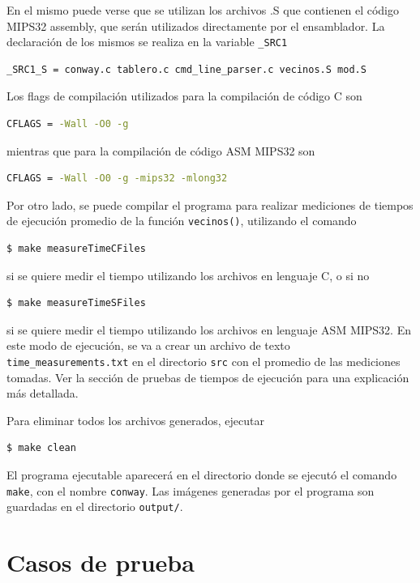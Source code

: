 \documentclass[a4paper,12pt]{article}
\numberwithin{equation}{section}
\numberwithin{figure}{section}
\begin{document}
En el mismo puede verse que se utilizan los archivos .S que contienen el código MIPS32 assembly, que serán utilizados directamente por el ensamblador. La declaración de los mismos se realiza en la variable \texttt{\_SRC1}
\begin{lstlisting}[language=bash, style=StyleC]
_SRC1_S = conway.c tablero.c cmd_line_parser.c vecinos.S mod.S
\end{lstlisting}

Los flags de compilación utilizados para la compilación de código C son
\begin{lstlisting}[language=bash, style=StyleC]
CFLAGS = -Wall -O0 -g
\end{lstlisting}
mientras que para la compilación de código ASM MIPS32 son
\begin{lstlisting}[language=bash, style=StyleC]
CFLAGS = -Wall -O0 -g -mips32 -mlong32
\end{lstlisting}

Por otro lado, se puede compilar el programa para realizar mediciones de tiempos de ejecución promedio de la función \texttt{vecinos()}, utilizando el comando
\begin{lstlisting}[language=bash, style=StyleC]
$ make measureTimeCFiles
\end{lstlisting}
si se quiere medir el tiempo utilizando los archivos en lenguaje C, o si no
\begin{lstlisting}[language=bash, style=StyleC]
$ make measureTimeSFiles
\end{lstlisting}
si se quiere medir el tiempo utilizando los archivos en lenguaje ASM MIPS32. En este modo de ejecución, se va a crear un archivo de texto \texttt{time\_measurements.txt} en el directorio \texttt{src} con el promedio de las mediciones tomadas. Ver la sección de pruebas de tiempos de ejecución para una explicación más detallada.

Para eliminar todos los archivos generados, ejecutar
\begin{lstlisting}[language=bash, style=StyleC]
$ make clean
\end{lstlisting}

El programa ejecutable aparecerá en el directorio donde se ejecutó el comando \texttt{make}, con el nombre \texttt{conway}. Las imágenes generadas por el programa son guardadas en el directorio \texttt{output/}.

\clearpage
\section{Casos de prueba}
\end{document}
